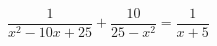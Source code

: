 \begin{ex}
	\begin{condition}
	\( \dfrac{1}{x^2-10x+25}+\dfrac{10}{25-x^2}=\dfrac{1}{x+5} \)
	\end{condition}
\end{ex}